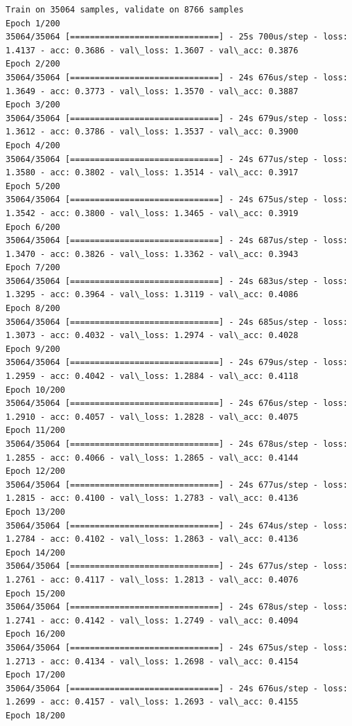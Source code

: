 \documentclass[11pt]{article}
\begin{document}
    \begin{Verbatim}[commandchars=\\\{\}]
Train on 35064 samples, validate on 8766 samples
Epoch 1/200
35064/35064 [==============================] - 25s 700us/step - loss: 1.4137 - acc: 0.3686 - val\_loss: 1.3607 - val\_acc: 0.3876
Epoch 2/200
35064/35064 [==============================] - 24s 676us/step - loss: 1.3649 - acc: 0.3773 - val\_loss: 1.3570 - val\_acc: 0.3887
Epoch 3/200
35064/35064 [==============================] - 24s 679us/step - loss: 1.3612 - acc: 0.3786 - val\_loss: 1.3537 - val\_acc: 0.3900
Epoch 4/200
35064/35064 [==============================] - 24s 677us/step - loss: 1.3580 - acc: 0.3802 - val\_loss: 1.3514 - val\_acc: 0.3917
Epoch 5/200
35064/35064 [==============================] - 24s 675us/step - loss: 1.3542 - acc: 0.3800 - val\_loss: 1.3465 - val\_acc: 0.3919
Epoch 6/200
35064/35064 [==============================] - 24s 687us/step - loss: 1.3470 - acc: 0.3826 - val\_loss: 1.3362 - val\_acc: 0.3943
Epoch 7/200
35064/35064 [==============================] - 24s 683us/step - loss: 1.3295 - acc: 0.3964 - val\_loss: 1.3119 - val\_acc: 0.4086
Epoch 8/200
35064/35064 [==============================] - 24s 685us/step - loss: 1.3073 - acc: 0.4032 - val\_loss: 1.2974 - val\_acc: 0.4028
Epoch 9/200
35064/35064 [==============================] - 24s 679us/step - loss: 1.2959 - acc: 0.4042 - val\_loss: 1.2884 - val\_acc: 0.4118
Epoch 10/200
35064/35064 [==============================] - 24s 676us/step - loss: 1.2910 - acc: 0.4057 - val\_loss: 1.2828 - val\_acc: 0.4075
Epoch 11/200
35064/35064 [==============================] - 24s 678us/step - loss: 1.2855 - acc: 0.4066 - val\_loss: 1.2865 - val\_acc: 0.4144
Epoch 12/200
35064/35064 [==============================] - 24s 677us/step - loss: 1.2815 - acc: 0.4100 - val\_loss: 1.2783 - val\_acc: 0.4136
Epoch 13/200
35064/35064 [==============================] - 24s 674us/step - loss: 1.2784 - acc: 0.4102 - val\_loss: 1.2863 - val\_acc: 0.4136
Epoch 14/200
35064/35064 [==============================] - 24s 677us/step - loss: 1.2761 - acc: 0.4117 - val\_loss: 1.2813 - val\_acc: 0.4076
Epoch 15/200
35064/35064 [==============================] - 24s 678us/step - loss: 1.2741 - acc: 0.4142 - val\_loss: 1.2749 - val\_acc: 0.4094
Epoch 16/200
35064/35064 [==============================] - 24s 675us/step - loss: 1.2713 - acc: 0.4134 - val\_loss: 1.2698 - val\_acc: 0.4154
Epoch 17/200
35064/35064 [==============================] - 24s 676us/step - loss: 1.2699 - acc: 0.4157 - val\_loss: 1.2693 - val\_acc: 0.4155
Epoch 18/200

\end{Verbatim}
\end{document}

